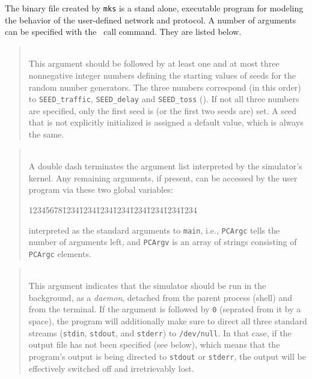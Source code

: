 The binary file created by {\tt mks} is a stand alone, executable
program for modeling the behavior of the user-defined network and
protocol.
A number of arguments can be specified with the \smurphtts\ call
command.
They are listed below.

\medskip

\begin{quote}
\noindent{}\\ \hspace{0in}
This argument should be followed by at least one and at most three
nonnegative integer numbers defining the starting values of seeds for
the random number generators.
The three numbers correspond (in this order) to {\tt SEED\_traffic},
{\tt SEED\_delay} and {\tt SEED\_toss} ().
If not all three numbers are specified, only the first seed is (or the first
two seeds are) set.
A seed that is not explicitly initialized is assigned a default value, which
is always the same.
\end{quote}

\begin{quote}
\noindent\hspace{-0.35in}{\bf {\tt --}}\\ \hspace{0in}
A double dash terminates the argument list interpreted by the simulator's
kernel.
Any remaining arguments, if present, can be accessed by the user program
via these two global variables:
{\tt\begin{tabbing}
12345678\=1234\=1234\=1234\=1234\=1234\=1234\=1234\=1234\kill
{} \\
\end{tabbing}}
\noindent
interpreted as the standard arguments to {\tt main}, i.e., {\tt PCArgc}
tells the number of arguments left, and {\tt PCArgv} is an array of strings
consisting of {\tt PCArgc} elements.
\end{quote}

\begin{quote}
\noindent{}\\ \hspace{0in}
This argument indicates that the simulator should be run in the background,
as a {\em daemon}, detached from the parent process (shell) and from the
terminal.
If the argument is followed by {\tt 0} (seprated from it by a space), the
program will additionally make sure to direct all three standard streams
({\tt stdin}, {\tt stdout}, and {\tt stderr}) to {\tt /dev/null}.
In that case,
if the output file has not been specified (see below), which means that
the program's
output is being directed to {\tt stdout} or {\tt stderr}, the output
will be effectively switched off and irretrievably lost.
\end{quote}

